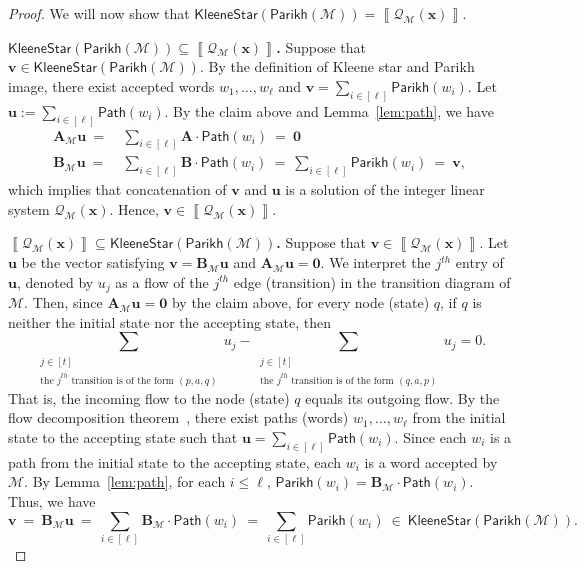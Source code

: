 \documentclass[10pt,a4paper]{article}
\theoremstyle{definition}
\theoremstyle{remark}
\newcommand{\cM}{\mathcal{M}}
\newcommand{\cQ}{\mathcal{Q}}
\newcommand{\bfA}{\mathbf{A}}
\newcommand{\bfB}{\mathbf{B}}
\newcommand{\bfu}{\mathbf{u}}
\newcommand{\bfv}{\mathbf{v}}
\newcommand{\bfx}{\mathbf{x}}
\newcommand{\bfzero}{\mathbf{0}}
\newcommand{\intsinterval}[1]{{\left[ #1 \right]}}
\newcommand{\kstar}[1] {\mathsf{KleeneStar}\left( #1 \right)}
\newcommand{\parikh}[1] {\mathsf{Parikh}\left( #1 \right)}
\newcommand{\mpath}[1] {\mathsf{Path}\left( #1 \right)}
\newcommand{\sol}[1] {\left\llbracket #1 \right\rrbracket}
\begin{document}
\begin{proof}
    We will now show that
    $\kstar{\parikh{\cM}} = \sol{\cQ_\cM(\bfx)}$.

    \textbf{\uline{$\kstar{\parikh{\cM}} \subseteq \sol{\cQ_\cM(\bfx)}$}.}
    Suppose that $\bfv \in \kstar{\parikh{\cM}}$.
    By the definition of Kleene star and Parikh image,
    there exist accepted words $w_1, \ldots, w_\ell$
    and $\bfv = \sum_{i \in \intsinterval{\ell}} \parikh{w_i}$.
    Let $\bfu := \sum_{i \in \intsinterval{\ell}} \mpath{w_i}$.
    By the claim above and Lemma~\ref{lem:path}, we have
    \begin{equation*}
        \begin{aligned}
            \bfA_\cM \bfu\ =\ &\sum_{i \in \intsinterval{\ell}} \bfA \cdot \mpath{w_i}\ =\ \bfzero \\
            \bfB_\cM \bfu\ =\ &\sum_{i \in \intsinterval{\ell}} \bfB \cdot \mpath{w_i}
            \ =\ \sum_{i \in \intsinterval{\ell}} \parikh{w_i}\ =\ \bfv,
        \end{aligned}
    \end{equation*}
    which implies that concatenation of $\bfv$ and $\bfu$ is a solution of the integer linear system $\cQ_\cM(\bfx)$.
    Hence, $\bfv \in \sol{\cQ_\cM(\bfx)}$.

    \textbf{\uline{$\sol{\cQ_\cM(\bfx)}\subseteq\kstar{\parikh{\cM}}$}.}
    Suppose that $\bfv \in \sol{\cQ_\cM(\bfx)}$.
    Let $\bfu$ be the vector satisfying $\bfv = \bfB_\cM\bfu$ and $\bfA_\cM\bfu = \bfzero$.
    We interpret the $j^{th}$ entry of $\bfu$, denoted by $u_j$
    as a flow of the $j^{th}$ edge (transition) in the transition diagram of $\cM$.
    Then, since $\bfA_\cM\bfu = \bfzero$ by the claim above,
    for every node (state) $q$,
    if $q$ is neither the initial state nor the accepting state,
    then 
    \begin{equation*}
        \sum_{\substack{
                j \in \intsinterval{t}\\
                \text{the $j^{th}$ transition is of the form $(p, a, q)$}
        }} u_j
        -
        \sum_{\substack{
                j \in \intsinterval{t}\\
                \text{the $j^{th}$ transition is of the form $(q, a, p)$}
        }} u_j
        = 0.
    \end{equation*}
    That is, the incoming flow to the node (state) $q$ equals its outgoing flow.
    By the flow decomposition theorem~\cite{flow},
    there exist paths (words) $w_1, \ldots, w_\ell$ from the initial state to the accepting state
    such that $\bfu = \sum_{i \in \intsinterval{\ell}} \mpath{w_i}$.
    Since each $w_i$ is a path from the initial state to the accepting state, each
    $w_i$ is a word accepted by $\cM$.
    By Lemma~\ref{lem:path}, for each $i \leq \ell$, $\parikh{w_i} = \bfB_\cM\cdot\mpath{w_i}$.
    Thus, we have
    \begin{equation*}
        \bfv
        \ =\ \bfB_\cM\bfu
        \ =\ \sum_{i \in \intsinterval{\ell}} \bfB_\cM\cdot\mpath{w_i}
        \ =\ \sum_{i \in \intsinterval{\ell}} \parikh{w_i}
        \ \in\ \kstar{\parikh{\cM}}.
    \end{equation*}
\end{proof}
\end{document}
